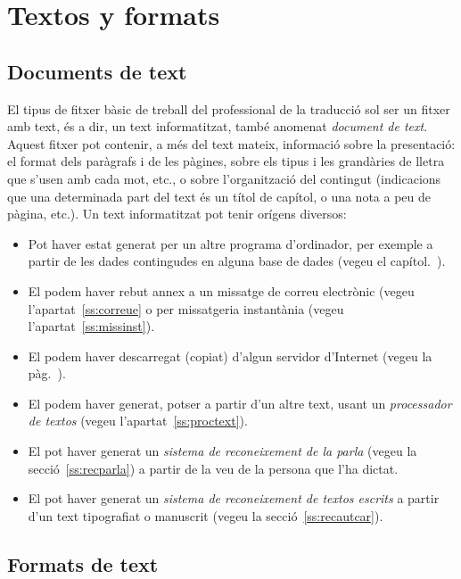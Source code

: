 \chapter{Textos y formats}
\label{se:EPT}

\section{Documents de text}

El tipus de fitxer bàsic de treball del professional de la traducció
sol ser un fitxer amb text, és a dir, un text informatitzat, també
anomenat \emph{document de text}. Aquest fitxer pot contenir, a més
del text mateix, informació sobre la presentació: el format dels
paràgrafs i de les pàgines, sobre els tipus i les grandàries de lletra
que s'usen amb cada mot, etc., o sobre l'organització del contingut
(indicacions que una determinada part del text és un títol de capítol,
o una nota a peu de pàgina, etc.).  Un text informatitzat pot tenir
orígens diversos:
\begin{itemize}
\item Pot haver estat generat per un altre programa d'ordinador, per
  exemple a partir de les dades contingudes en alguna base de dades
  (vegeu el capítol.~\pageref{se:basesdades}).
\item El podem haver rebut annex a un missatge de correu electrònic
  (vegeu l'apartat~\ref{ss:correue} o per missatgeria instantània
  (vegeu l'apartat~\ref{ss:missinst}).
\item El podem haver descarregat (copiat) d'algun servidor d'Internet
  (vegeu la pàg.~\pageref{pg:ftp}).
\item El podem haver generat, potser a partir d'un altre
  text, usant un \emph{processador de textos} (vegeu
  l'apartat~\ref{ss:proctext}).
\item El pot haver generat un \emph{sistema de reconeixement de la
    parla} (vegeu la secció~\ref{ss:recparla}) a partir de la veu de
  la persona que l'ha dictat.
\item El pot haver generat un \emph{sistema de reconeixement de textos
    escrits} a partir d'un text tipografiat o manuscrit (vegeu la
  secció~\ref{ss:recautcar}).
\end{itemize}

\section{Formats de text}
\label{ss:formats}

